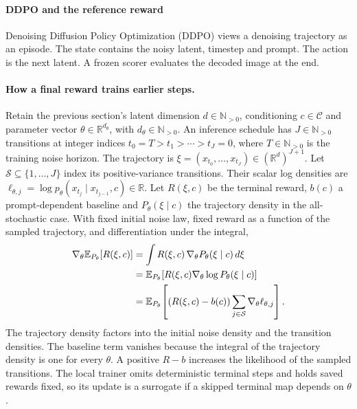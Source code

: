 \paragraph{DDPO and the reference reward}
Denoising Diffusion Policy Optimization (DDPO) \citep{black2024ddpo} views a denoising trajectory as an episode. The state contains the noisy latent, timestep and prompt. The action is the next latent. A frozen scorer evaluates the decoded image at the end.

\paragraph{How a final reward trains earlier steps.}
Retain the previous section's latent dimension $d\in\mathbb N_{>0}$, conditioning $c\in\mathcal C$ and parameter vector $\theta\in\mathbb R^{d_\theta}$, with $d_\theta\in\mathbb N_{>0}$. An inference schedule has $J\in\mathbb N_{>0}$ transitions at integer indices $t_0=T>t_1>\cdots>t_J=0$, where $T\in\mathbb N_{>0}$ is the training noise horizon. The trajectory is $\xi=(x_{t_0},\ldots,x_{t_J})\in(\mathbb R^d)^{J+1}$. Let $\mathcal S\subseteq\{1,\ldots,J\}$ index its positive-variance transitions. Their scalar log densities are
$\ell_{\theta,j}=\log p_\theta(x_{t_j}\mid x_{t_{j-1}},c)\in\mathbb R$.
Let $R(\xi,c)$ be the terminal reward, $b(c)$ a prompt-dependent baseline and $P_\theta(\xi\mid c)$ the trajectory density in the all-stochastic case. With fixed initial noise law, fixed reward as a function of the sampled trajectory, and differentiation under the integral,
\begin{align}
 \nabla_\theta\mathbb{E}_{P_\theta}[R(\xi,c)]
   &=\int R(\xi,c)\,\nabla_\theta P_\theta(\xi\mid c)\,d\xi
       \label{eq:ddpo-differentiate-expectation}\\
   &=\mathbb{E}_{P_\theta}\!\left[R(\xi,c)
       \nabla_\theta\log P_\theta(\xi\mid c)\right]
       \label{eq:ddpo-score-identity}\\
   &=\mathbb{E}_{P_\theta}\!\left[(R(\xi,c)-b(c))
           \sum_{j\in\mathcal S}\nabla_\theta\ell_{\theta,j}\right].
       \label{eq:ddpo-policy-gradient}
\end{align}
The trajectory density factors into the initial noise density and the transition densities. The baseline term vanishes because the integral of the trajectory density is one for every $\theta$. A positive $R-b$ increases the likelihood of the sampled transitions. The local trainer omits deterministic terminal steps and holds saved rewards fixed, so its update is a surrogate if a skipped terminal map depends on $\theta$.

